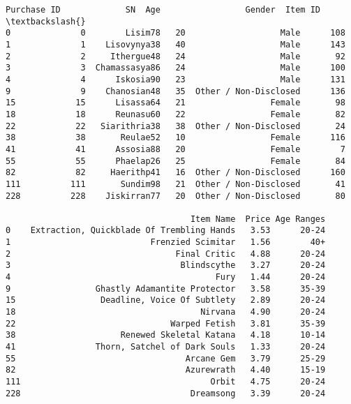 \documentclass[11pt]{article}
\makeatletter
\newcommand{\boxspacing}{\kern\kvtcb@left@rule\kern\kvtcb@boxsep}
\newcommand{\prompt}[4]{
        {\ttfamily\llap{{\color{#2}[#3]:\hspace{3pt}#4}}\vspace{-\baselineskip}}
    }
\makeatother
\begin{document}
            \begin{tcolorbox}[breakable, size=fbox, boxrule=.5pt, pad at break*=1mm, opacityfill=0]
\prompt{Out}{outcolor}{98}{\boxspacing}
\begin{Verbatim}[commandchars=\\\{\}]
     Purchase ID             SN  Age                 Gender  Item ID  \textbackslash{}
0              0        Lisim78   20                   Male      108
1              1    Lisovynya38   40                   Male      143
2              2     Ithergue48   24                   Male       92
3              3  Chamassasya86   24                   Male      100
4              4      Iskosia90   23                   Male      131
9              9    Chanosian48   35  Other / Non-Disclosed      136
15            15      Lisassa64   21                 Female       98
18            18      Reunasu60   22                 Female       82
22            22   Siarithria38   38  Other / Non-Disclosed       24
38            38       Reulae52   10                 Female      116
41            41      Assosia88   20                 Female        7
55            55      Phaelap26   25                 Female       84
82            82     Haerithp41   16  Other / Non-Disclosed      160
111          111       Sundim98   21  Other / Non-Disclosed       41
228          228    Jiskirran77   20  Other / Non-Disclosed       80

                                     Item Name  Price Age Ranges
0    Extraction, Quickblade Of Trembling Hands   3.53      20-24
1                            Frenzied Scimitar   1.56        40+
2                                 Final Critic   4.88      20-24
3                                  Blindscythe   3.27      20-24
4                                         Fury   1.44      20-24
9                 Ghastly Adamantite Protector   3.58      35-39
15                 Deadline, Voice Of Subtlety   2.89      20-24
18                                     Nirvana   4.90      20-24
22                               Warped Fetish   3.81      35-39
38                     Renewed Skeletal Katana   4.18      10-14
41                Thorn, Satchel of Dark Souls   1.33      20-24
55                                  Arcane Gem   3.79      25-29
82                                  Azurewrath   4.40      15-19
111                                      Orbit   4.75      20-24
228                                  Dreamsong   3.39      20-24
\end{Verbatim}
\end{tcolorbox}
        
\end{document}

